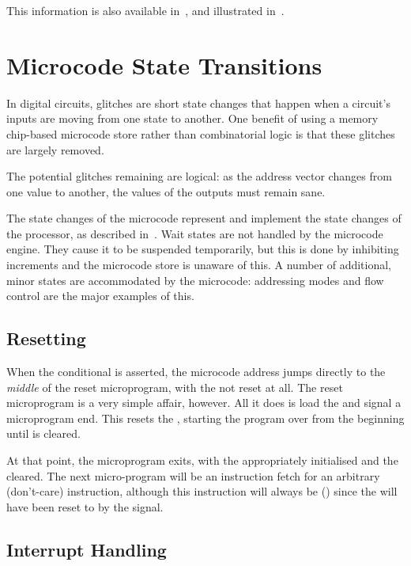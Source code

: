 This information is also available in~, and
illustrated in~.





\section{Microcode State Transitions}

In digital circuits, glitches are short state changes that happen when a
circuit's inputs are moving from one state to another. One benefit of using a
memory chip-based microcode store rather than combinatorial logic is that these
glitches are largely removed.

The potential glitches remaining are logical: as the address vector
changes from one value to another, the values of the outputs must
remain sane.

The state changes of the microcode represent and implement the state
changes of the processor, as described in~. Wait
states are not handled by the microcode engine. They cause it to be
suspended temporarily, but this is done by inhibiting \UPC{}
increments and the microcode store is unaware of this. A number of
additional, minor states are accommodated by the microcode: addressing
modes and flow control are the major examples of this.

\subsection{Resetting}

When the  conditional is asserted, the microcode address jumps
directly to the {\em middle\/} of the reset microprogram, with the
\UPC{} not reset at all. The reset microprogram is a very simple
affair, however. All it does is load the \PC{} and signal a
microprogram end. This resets the \UPC{}, starting the program over
from the beginning until  is cleared.

At that point, the microprogram exits, with the \PC{} appropriately
initialised and the \UPC{} cleared. The next micro-program will be an
instruction fetch for an arbitrary (don't-care) instruction, although
this instruction will always be  () since the
\IR{} will have been reset to  by the  signal.

\subsection{Interrupt Handling}

